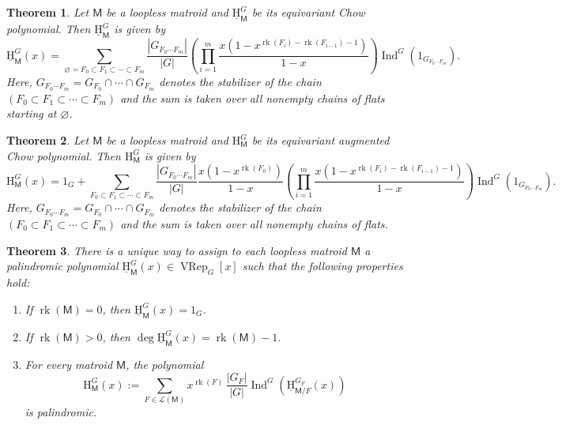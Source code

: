 \documentclass[11pt, a4paper, english]{amsart}
\theoremstyle{teoremas}
\newtheorem{theorem}{Theorem}[section]
\theoremstyle{definition}
\DeclareMathOperator{\rk}{rk}
\newcommand{\M}{\mathsf{M}}
\renewcommand{\H}{\mathrm{H}}
\newcommand{\uH}{\underline{\mathrm{H}}}
\newcommand{\VRep}{\operatorname{VRep}}
\newcommand{\Ind}{\operatorname{Ind}}
\begin{document}
\begin{theorem}\label{thm:main-perm-rep}
    Let $\M$ be a loopless matroid and $\uH_{\M}^G$ be its equivariant Chow polynomial. Then $\uH_{\M}^G$ is given by
    \begin{equation}\label{eqn:main-perm-rep}
        \uH_{\M}^G(x) = \sum_{\varnothing = F_0\subset F_1\subset\cdots\subset F_m}{\frac{|G_{F_0\cdots F_m}|}{|G|}
        \left(\prod_{i=1}^{m}{\frac{x(1-x^{\rk(F_i)-\rk(F_{i-1})-1})}{1-x}}\right)
        \Ind^G(1_{G_{F_0\cdots F_m}})}.
    \end{equation}
    Here, $G_{F_0\cdots F_m} = G_{F_0}\cap\cdots\cap G_{F_m}$ denotes the stabilizer of the chain $(F_0\subset F_1\subset\cdots\subset F_m)$
    and the sum is taken over all nonempty chains of flats starting at $\varnothing$.
\end{theorem}

\begin{theorem}\label{thm:main-perm-rep-augmented}
    Let $\M$ be a loopless matroid and $\H_{\M}^G$ be its equivariant augmented Chow polynomial. Then $\H_{\M}^G$ is given by
    \begin{equation}
        \H_{\M}^G(x) = 1_G + \sum_{F_0\subset F_1\subset\cdots\subset F_m}\frac{|G_{F_0\cdots F_m}|}{|G|}
        \frac{x(1-x^{\rk(F_0)})}{1-x}
        \left(\prod_{i=1}^{m}{\frac{x(1-x^{\rk(F_i)-\rk(F_{i-1})-1})}{1-x}}\right)
        \Ind^G(1_{G_{F_0\cdots F_m}}).
    \end{equation}
    Here, $G_{F_0\cdots F_m} = G_{F_0}\cap\cdots\cap G_{F_m}$ denotes the stabilizer of the chain $(F_0\subset F_1\subset\cdots\subset F_m)$
    and the sum is taken over all nonempty chains of flats.
\end{theorem}

\begin{theorem}\label{thm:equiv-main-recursion-defi-H-and-uH}
    There is a unique way to assign to each loopless matroid $\M$ a palindromic polynomial $\uH_{\M}^G(x) \in \VRep_G[x]$ such that the following properties hold:
    \begin{enumerate}[\normalfont(i)]
        \item If $\rk(\M) = 0$, then $\uH_{\M}^G(x) = 1_G$.\label{it:mainfirst}\
        \item If $\rk(\M) > 0$, then $\deg \uH_{\M}^G(x) = \rk(\M) - 1$.\label{it:mainsecond}
        \item For every matroid $\M$, the polynomial
            \[ \H_{\M}^G(x) := \sum_{F\in \mathcal{L}(\M)} x^{\rk(F)}\, \frac{|G_F|}{|G|}\Ind^G\left(\uH_{\M/F}^{G_F}(x)\right)\]
        is palindromic.\label{it:main-equiv-third}
    \end{enumerate}
\end{theorem}
\end{document}
